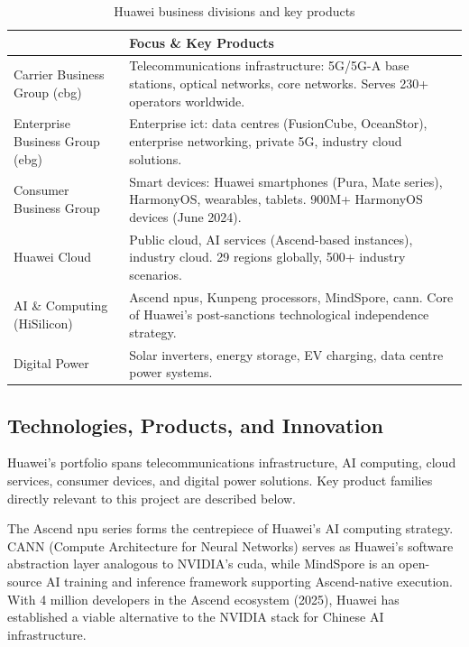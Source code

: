 \begin{table}[htbp]
  \centering
  \caption{Huawei business divisions and key products}
  \label{tab:business-groups}
  \begin{tabularx}{\textwidth}{lX}
    \toprule
    \tableheader{Division & Focus \& Key Products} \\
    \midrule
    Carrier Business Group (\acrshort{cbg})
      & Telecommunications infrastructure: 5G/5G-A base stations, optical
        networks, core networks. Serves 230+ operators worldwide. \\
    \rowcolor{TableRowOdd}
    Enterprise Business Group (\acrshort{ebg})
      & Enterprise \acrshort{ict}: data centres (FusionCube, OceanStor), enterprise
        networking, private 5G, industry cloud solutions. \\
    Consumer Business Group
      & Smart devices: Huawei smartphones (Pura, Mate series), HarmonyOS,
        wearables, tablets. 900M+ HarmonyOS devices (June 2024). \\
    \rowcolor{TableRowOdd}
    Huawei Cloud
      & Public cloud, AI services (Ascend-based instances), industry cloud.
        29 regions globally, 500+ industry scenarios. \\
    AI \& Computing (HiSilicon)
      & Ascend \acrshort{npu}s, Kunpeng processors, MindSpore, \acrshort{cann}.
        Core of Huawei's post-sanctions technological independence strategy. \\
    \rowcolor{TableRowOdd}
    Digital Power
      & Solar inverters, energy storage, EV charging, data centre power systems. \\
    \bottomrule
  \end{tabularx}
\end{table}

\subsection{Technologies, Products, and Innovation}
\label{subsec:huawei-tech}

Huawei's portfolio spans telecommunications infrastructure, AI computing,
cloud services, consumer devices, and digital power solutions. Key product
families directly relevant to this project are described below.


The Ascend \acrshort{npu} series forms the centrepiece of Huawei's AI computing
strategy. CANN (Compute Architecture for Neural Networks) serves as Huawei's
software abstraction layer analogous to NVIDIA's \acrshort{cuda}, while
MindSpore is an open-source AI training and inference framework supporting
Ascend-native execution. With 4 million developers in the Ascend ecosystem
(2025), Huawei has established a viable alternative to the NVIDIA stack for
Chinese AI infrastructure.

